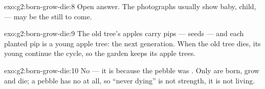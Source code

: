 \begin{solution}{exo:g2:born-grow-die:8}
Open answer. The photographs usually show baby, child,  ---
 may be the  still to come.
\end{solution}

\begin{solution}{exo:g2:born-grow-die:9}
The old tree's apples carry pips --- seeds --- and each planted
pip is a young apple tree: the next generation. When the old tree
dies, its young continue the cycle, so the garden keeps its apple
trees.
\end{solution}

\begin{solution}{exo:g2:born-grow-die:10}
No --- it is because the pebble was . Only  are born, grow and die; a pebble has no  at all,
so ``never dying'' is not strength, it is not living.
\end{solution}

